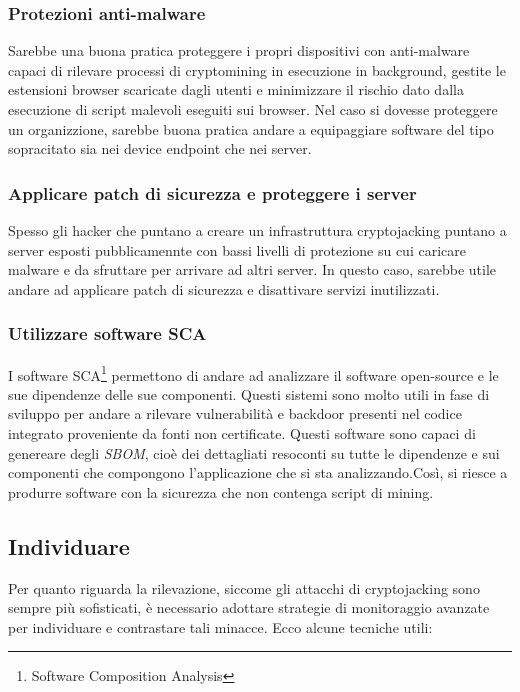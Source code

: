 \documentclass[12pt,a4paper]{article}
\begin{document}
\subsubsection*{Protezioni anti-malware}
Sarebbe una buona pratica proteggere i propri dispositivi con anti-malware
capaci di rilevare processi di cryptomining in esecuzione in background, gestite
le estensioni browser scaricate dagli utenti e minimizzare il rischio dato dalla
esecuzione di script malevoli eseguiti sui browser. Nel caso si dovesse
proteggere un organizzione, sarebbe buona pratica andare a equipaggiare software
del tipo sopracitato sia nei device endpoint che nei server.

\subsubsection*{Applicare patch di sicurezza e proteggere i server}
Spesso gli hacker che puntano a creare un infrastruttura cryptojacking puntano a
server esposti pubblicamennte con bassi livelli di protezione su cui caricare
malware e da sfruttare per arrivare ad altri server. In questo caso, sarebbe
utile andare ad applicare patch di sicurezza e disattivare servizi inutilizzati.

\subsubsection*{Utilizzare software SCA}
I software SCA\footnote{Software Composition Analysis} permettono di andare ad
analizzare il software open-source e le sue dipendenze delle sue componenti.
Questi sistemi sono molto utili in fase di sviluppo per andare a rilevare
vulnerabilità e backdoor presenti nel codice integrato proveniente da fonti non
certificate. Questi software sono capaci di genereare degli \textit{SBOM}, cioè
dei dettagliati resoconti su tutte le dipendenze e sui componenti che compongono
l'applicazione che si sta analizzando.Così, si riesce a produrre software con la
sicurezza che non contenga script di mining.

\subsection{Individuare}
Per quanto riguarda la rilevazione, siccome gli attacchi di cryptojacking sono
sempre più sofisticati, è necessario adottare strategie di monitoraggio avanzate
per individuare e contrastare tali minacce. Ecco alcune tecniche utili:
\end{document}
